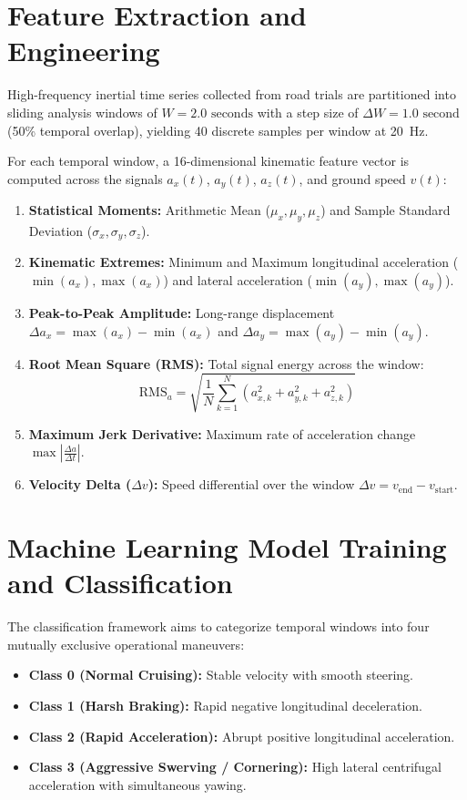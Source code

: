\section{Feature Extraction and Engineering}
\label{sec:impl_features}
High-frequency inertial time series collected from road trials are partitioned into sliding analysis windows of $W = 2.0\text{ seconds}$ with a step size of $\Delta W = 1.0\text{ second}$ (50\% temporal overlap), yielding 40 discrete samples per window at 20~Hz. 

For each temporal window, a 16-dimensional kinematic feature vector is computed across the signals $a_x(t)$, $a_y(t)$, $a_z(t)$, and ground speed $v(t)$:
\begin{enumerate}
    \item \textbf{Statistical Moments:} Arithmetic Mean ($\mu_x, \mu_y, \mu_z$) and Sample Standard Deviation ($\sigma_x, \sigma_y, \sigma_z$).
    \item \textbf{Kinematic Extremes:} Minimum and Maximum longitudinal acceleration ($\min(a_x), \max(a_x)$) and lateral acceleration ($\min(a_y), \max(a_y)$).
    \item \textbf{Peak-to-Peak Amplitude:} Long-range displacement $\Delta a_x = \max(a_x) - \min(a_x)$ and $\Delta a_y = \max(a_y) - \min(a_y)$.
    \item \textbf{Root Mean Square (RMS):} Total signal energy across the window:
    \begin{equation}
        \text{RMS}_a = \sqrt{\frac{1}{N} \sum_{k=1}^N \left(a_{x,k}^2 + a_{y,k}^2 + a_{z,k}^2\right)}
    \end{equation}
    \item \textbf{Maximum Jerk Derivative:} Maximum rate of acceleration change $\max\left|\frac{\Delta a}{\Delta t}\right|$.
    \item \textbf{Velocity Delta ($\Delta v$):} Speed differential over the window $\Delta v = v_{\text{end}} - v_{\text{start}}$.
\end{enumerate}

\section{Machine Learning Model Training and Classification}
\label{sec:impl_ml}
The classification framework aims to categorize temporal windows into four mutually exclusive operational maneuvers:
\begin{itemize}
    \item \textbf{Class 0 (Normal Cruising):} Stable velocity with smooth steering.
    \item \textbf{Class 1 (Harsh Braking):} Rapid negative longitudinal deceleration.
    \item \textbf{Class 2 (Rapid Acceleration):} Abrupt positive longitudinal acceleration.
    \item \textbf{Class 3 (Aggressive Swerving / Cornering):} High lateral centrifugal acceleration with simultaneous yawing.
\end{itemize}

